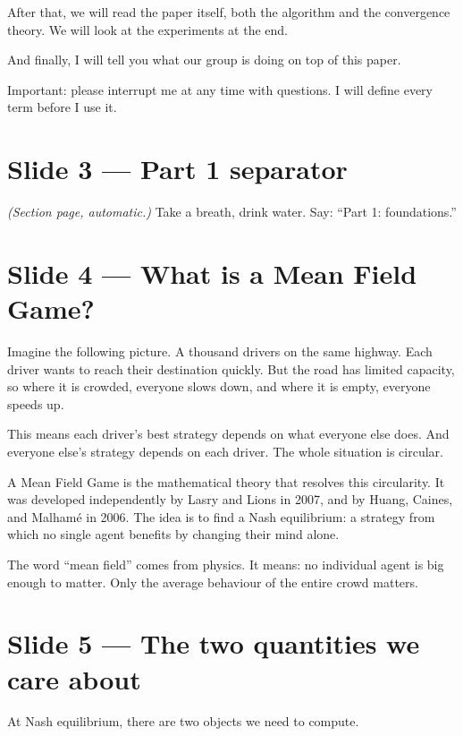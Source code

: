 \documentclass[11pt]{article}
\begin{document}
After that, we will read the paper itself, both the algorithm and the
convergence theory. We will look at the experiments at the end.

And finally, I will tell you what our group is doing on top of this paper.

Important: please interrupt me at any time with questions. I will define
every term before I use it.

\section*{Slide 3 --- Part 1 separator}

\textit{(Section page, automatic.)}  Take a breath, drink water.  Say:
``Part 1: foundations.''

\section*{Slide 4 --- What is a Mean Field Game?}

Imagine the following picture. A thousand drivers on the same highway. Each
driver wants to reach their destination quickly. But the road has limited
capacity, so where it is crowded, everyone slows down, and where it is empty,
everyone speeds up.

This means each driver's best strategy depends on what everyone else does.
And everyone else's strategy depends on each driver. The whole situation is
circular.

A Mean Field Game is the mathematical theory that resolves this circularity.
It was developed independently by Lasry and Lions in 2007, and by Huang,
Caines, and Malham\'e in 2006. The idea is to find a Nash equilibrium: a
strategy from which no single agent benefits by changing their mind alone.

The word ``mean field'' comes from physics. It means: no individual agent is
big enough to matter. Only the average behaviour of the entire crowd matters.

\section*{Slide 5 --- The two quantities we care about}

At Nash equilibrium, there are two objects we need to compute.
\end{document}
